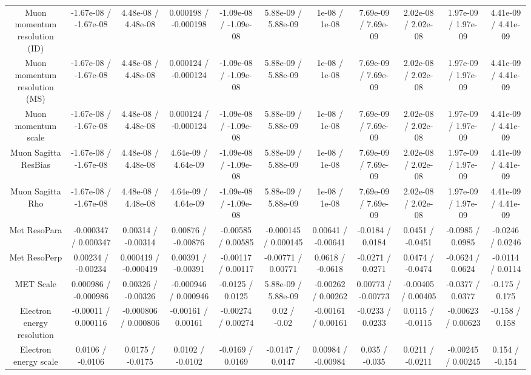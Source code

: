 \begin{table}[htbp]
\begin{center}
\begin{tabular}{|c|c|c|c|c|c|c|c|c|c|c|}
  Muon momentum resolution (ID) & -1.67e-08 / -1.67e-08 & 4.48e-08 / 4.48e-08 & 0.000198 / -0.000198 & -1.09e-08 / -1.09e-08 & 5.88e-09 / 5.88e-09 & 1e-08 / 1e-08 & 7.69e-09 / 7.69e-09 & 2.02e-08 / 2.02e-08 & 1.97e-09 / 1.97e-09 & 4.41e-09 / 4.41e-09 \\ 
  Muon momentum resolution (MS) & -1.67e-08 / -1.67e-08 & 4.48e-08 / 4.48e-08 & 0.000124 / -0.000124 & -1.09e-08 / -1.09e-08 & 5.88e-09 / 5.88e-09 & 1e-08 / 1e-08 & 7.69e-09 / 7.69e-09 & 2.02e-08 / 2.02e-08 & 1.97e-09 / 1.97e-09 & 4.41e-09 / 4.41e-09 \\ 
  Muon momentum scale & -1.67e-08 / -1.67e-08 & 4.48e-08 / 4.48e-08 & 0.000124 / -0.000124 & -1.09e-08 / -1.09e-08 & 5.88e-09 / 5.88e-09 & 1e-08 / 1e-08 & 7.69e-09 / 7.69e-09 & 2.02e-08 / 2.02e-08 & 1.97e-09 / 1.97e-09 & 4.41e-09 / 4.41e-09 \\ 
  Muon Sagitta ResBias & -1.67e-08 / -1.67e-08 & 4.48e-08 / 4.48e-08 & 4.64e-09 / 4.64e-09 & -1.09e-08 / -1.09e-08 & 5.88e-09 / 5.88e-09 & 1e-08 / 1e-08 & 7.69e-09 / 7.69e-09 & 2.02e-08 / 2.02e-08 & 1.97e-09 / 1.97e-09 & 4.41e-09 / 4.41e-09 \\ 
  Muon Sagitta Rho & -1.67e-08 / -1.67e-08 & 4.48e-08 / 4.48e-08 & 4.64e-09 / 4.64e-09 & -1.09e-08 / -1.09e-08 & 5.88e-09 / 5.88e-09 & 1e-08 / 1e-08 & 7.69e-09 / 7.69e-09 & 2.02e-08 / 2.02e-08 & 1.97e-09 / 1.97e-09 & 4.41e-09 / 4.41e-09 \\ 
  Met ResoPara & -0.000347 / 0.000347 & 0.00314 / -0.00314 & 0.00876 / -0.00876 & -0.00585 / 0.00585 & -0.000145 / 0.000145 & 0.00641 / -0.00641 & -0.0184 / 0.0184 & 0.0451 / -0.0451 & -0.0985 / 0.0985 & -0.0246 / 0.0246 \\ 
  Met ResoPerp & 0.00234 / -0.00234 & 0.000419 / -0.000419 & 0.00391 / -0.00391 & -0.00117 / 0.00117 & -0.00771 / 0.00771 & 0.0618 / -0.0618 & -0.0271 / 0.0271 & 0.0474 / -0.0474 & -0.0624 / 0.0624 & -0.0114 / 0.0114 \\ 
  MET Scale & 0.000986 / -0.000986 & 0.00326 / -0.00326 & -0.000946 / 0.000946 & -0.0125 / 0.0125 & 5.88e-09 / 5.88e-09 & -0.00262 / 0.00262 & 0.00773 / -0.00773 & -0.00405 / 0.00405 & -0.0377 / 0.0377 & -0.175 / 0.175 \\ 
  Electron energy resolution & -0.00011 / 0.000116 & -0.000806 / 0.000806 & -0.00161 / 0.00161 & -0.00274 / 0.00274 & 0.02 / -0.02 & -0.00161 / 0.00161 & -0.0233 / 0.0233 & 0.0115 / -0.0115 & -0.00623 / 0.00623 & -0.158 / 0.158 \\ 
  Electron energy scale & 0.0106 / -0.0106 & 0.0175 / -0.0175 & 0.0102 / -0.0102 & -0.0169 / 0.0169 & -0.0147 / 0.0147 & 0.00984 / -0.00984 & 0.035 / -0.035 & 0.0211 / -0.0211 & -0.00245 / 0.00245 & 0.154 / -0.154 \\ 

\end{tabular}
\end{center}
\end{table}
